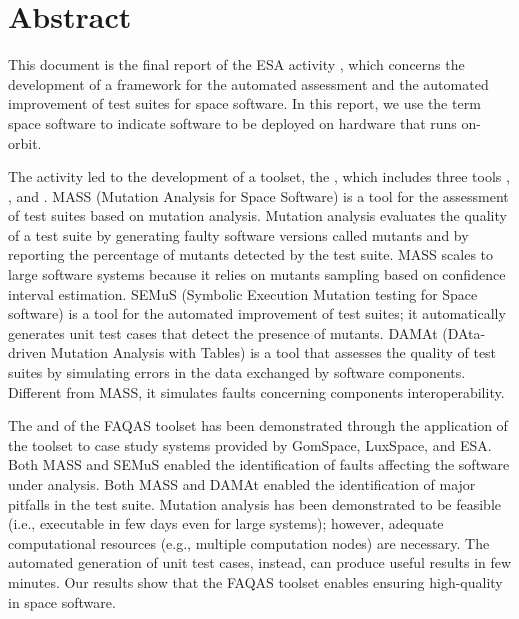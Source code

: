 
\chapter*{Abstract}
\label{sec:abstract}

This document is the final report of the ESA activity , which concerns the development of a framework for the automated assessment and the automated improvement of test suites for space software. In this report, we use the term space software to indicate software to be deployed on hardware that runs on-orbit.

The activity led to the development of a toolset, the , which includes three tools , , and . MASS (Mutation Analysis for Space Software) is a tool for the assessment of test suites based on mutation analysis. Mutation analysis evaluates the quality of a test suite by generating faulty software versions called mutants and by reporting the percentage of mutants detected by the test suite. MASS scales to large software systems because it relies on mutants sampling based on confidence interval estimation.  SEMuS (Symbolic Execution Mutation testing for Space software) is a tool for the automated improvement of test suites; it automatically generates unit test cases that detect the presence of mutants. DAMAt (DAta-driven Mutation Analysis with Tables) is a tool that assesses the quality of test suites by simulating errors in the data exchanged by software components. Different from MASS, it simulates faults concerning components interoperability.

The  and  of the FAQAS toolset has been demonstrated through the application of the toolset to case study systems provided by GomSpace, LuxSpace, and ESA. Both MASS and SEMuS enabled the identification of faults affecting the software under analysis. Both MASS and DAMAt enabled the identification of major pitfalls in the test suite. Mutation analysis has been demonstrated to be feasible (i.e., executable in few days even for large systems); however, adequate computational resources (e.g., multiple computation nodes) are necessary. The automated generation of unit test cases, instead, can produce useful results in few minutes. Our results show that the FAQAS toolset enables ensuring high-quality in space software.
